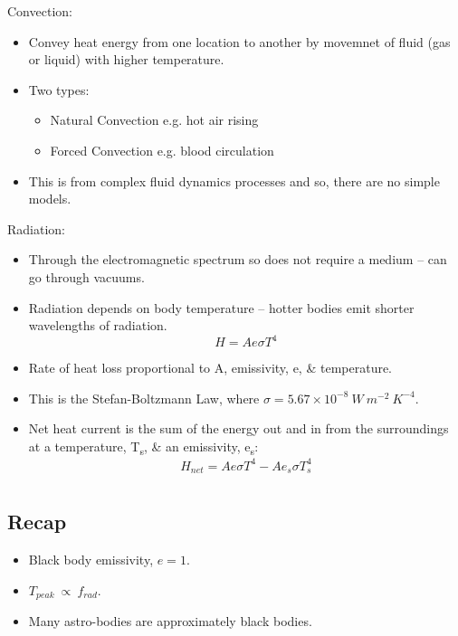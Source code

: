 \documentclass[a4paper, 11pt, normalem]{report}
\begin{document}
Convection:
\begin{itemize}
    \item Convey heat energy from one location to another by movemnet of fluid (gas or liquid) with higher temperature.
    \item Two types:
        \begin{itemize}
        	\item Natural Convection e.g. hot air rising
        	\item Forced Convection e.g. blood circulation
        \end{itemize}
    \item This is from complex fluid dynamics processes and so, there are no simple models.
\end{itemize}

Radiation:
\begin{itemize}
    \item Through the electromagnetic spectrum so does not require a medium -- can go through vacuums.
    \item Radiation depends on body temperature -- hotter bodies emit shorter wavelengths of radiation.
        \begin{equation}
        	H = Ae{\sigma}T^{4}
        \end{equation}
    \item Rate of heat loss proportional to A, emissivity, e, \& temperature.
    \item This is the Stefan-Boltzmann Law, where $\sigma = 5.67\times10^{-8}~W~m^{-2}~K^{-4}$.
    \item Net heat current is the sum of the energy out and in from the surroundings at a temperature, T\textsubscript{s}, \& an emissivity, e\textsubscript{s}:
        \begin{equation}
        	H_{net} = Ae{\sigma}T^{4} - Ae_{s}{\sigma}T^{4}_{s}
        \end{equation}
\end{itemize}

\chapter{}
\section{Recap}
\begin{itemize}
    \item Black body emissivity, $e = 1$.
    \item $T_{peak} ~\propto~f_{rad}$.
    \item Many astro-bodies are approximately black bodies.
\end{itemize}
\end{document}
